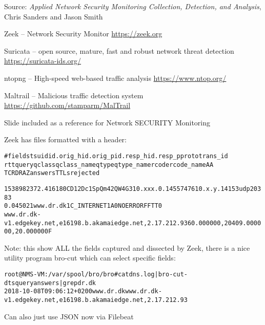 \documentclass[Screen16to9,17pt]{foils}
\begin{document}
Source: \emph{Applied Network Security Monitoring Collection, Detection, and Analysis}, Chris Sanders and Jason Smith





\begin{list1}
\item Zeek -- Network Security Monitor {\footnotesize\url{https://zeek.org}}
\item Suricata -- open source, mature, fast and robust network threat detection {\footnotesize\url{https://suricata-ids.org/}}
\item ntopng -- High-speed web-based traffic analysis  {\footnotesize\url{https://www.ntop.org/}}
\item Maltrail -- Malicious traffic detection system {\footnotesize\url{https://github.com/stamparm/MalTrail}}
\end{list1}

Slide included as a reference for Network SECURITY Monitoring



Zeek has files formatted with a header:
\begin{alltt}\footnotesize
#fields ts      uid     id.orig_h       id.orig_p       id.resp_h       id.resp_p       proto   trans_id
        rtt     query   qclass  qclass_name     qtype   qtype_name      rcode   rcode_name      AA
        TC      RD      RA      Z       answers TTLs    rejected

1538982372.416180	CD12Dc1SpQm42QW4G3	10.xxx.0.145	57476	10.x.y.141	53	udp	20383
	0.045021	www.dr.dk	1	C_INTERNET	1	A	0	NOERROR	F	F	T	T	0
   www.dr.dk-v1.edgekey.net,e16198.b.akamaiedge.net,2.17.212.93	60.000000,20409.000000,20.000000	F
\end{alltt}

Note: this show ALL the fields captured and dissected by Zeek, there is a nice utility program bro-cut which can select specific fields:

\begin{alltt}\small
root@NMS-VM:/var/spool/bro/bro# cat dns.log | bro-cut -d ts query answers | grep dr.dk
2018-10-08T09:06:12+0200	www.dr.dk	www.dr.dk-v1.edgekey.net,e16198.b.akamaiedge.net,2.17.212.93
\end{alltt}

Can also just use JSON now via Filebeat
\end{document}
